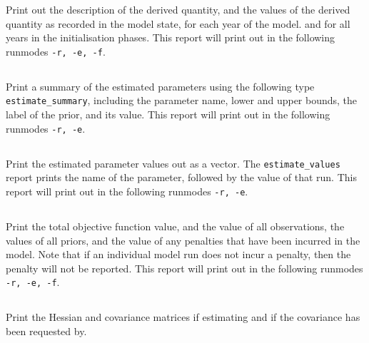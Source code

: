 Print out the description of the derived quantity, and the values of the derived quantity as recorded in the model state, for each year of the model. and for all years in the  initialisation phases. This report will print out in the following runmodes \texttt{-r, -e, -f}.

\subsection{}

Print a summary of the estimated parameters using the following type \texttt{estimate\_summary}, including the parameter name, lower and upper bounds, the label of the prior, and its value. This report will print out in the following runmodes \texttt{-r, -e}.

\subsection{}

Print the estimated parameter values out as a vector. The \texttt{estimate\_values} report prints the name of the parameter, followed by the value of that run.  This report will print out in the following runmodes \texttt{-r, -e}.

\subsection{}

Print the total objective function value, and the value of all observations, the values of all priors, and the value of any penalties that have been incurred in the model. Note that if an individual model run does not incur a penalty, then the penalty will not be reported. This report will print out in the following runmodes \texttt{-r, -e, -f}.

\subsection{}

Print the Hessian and covariance matrices if estimating and if the covariance has been requested by.

